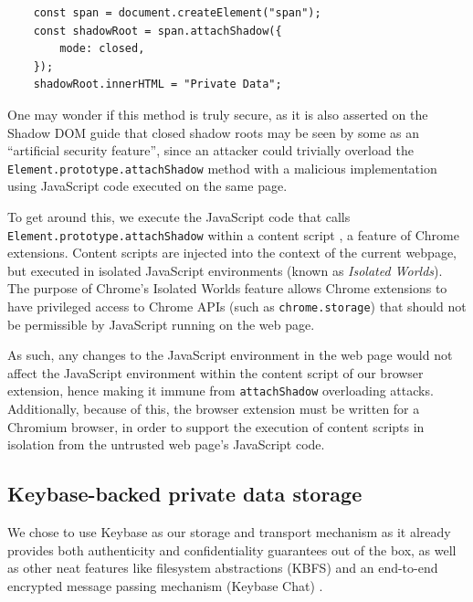\documentclass[letterpaper,twocolumn,10pt]{article}
\begin{document}
\begin{center}
    \begin{lstlisting}
    const span = document.createElement("span");
    const shadowRoot = span.attachShadow({
        mode: closed,
    });
    shadowRoot.innerHTML = "Private Data";
    \end{lstlisting}
    \label{fig:shadow_root}
\end{center}

One may wonder if this method is truly secure, as it is also asserted on the Shadow DOM guide \cite{Bidelman} that closed shadow roots may be seen by some as an ``artificial security feature'', since an attacker could trivially overload the \texttt{Element.prototype.attachShadow} method with a malicious implementation using JavaScript code executed on the same page.

To get around this, we execute the JavaScript code that calls \texttt{Element.prototype.attachShadow} within a content script \cite{ContentScript}, a feature of Chrome extensions. Content scripts are injected into the context of the current webpage, but executed in isolated JavaScript environments (known as \textit{Isolated Worlds}). The purpose of Chrome's Isolated Worlds feature allows Chrome extensions to have privileged access to Chrome APIs (such as \texttt{chrome.storage}) that should not be permissible by JavaScript running on the web page.

As such, any changes to the JavaScript environment in the web page would not affect the JavaScript environment within the content script of our browser extension, hence making it immune from \texttt{attachShadow} overloading attacks. Additionally, because of this, the browser extension must be written for a Chromium browser, in order to support the execution of content scripts in isolation from the untrusted web page's JavaScript code.

\subsection{Keybase-backed private data storage}

We chose to use Keybase \cite{Keybase} as our storage and transport mechanism as it already provides both authenticity and confidentiality guarantees out of the box, as well as other neat features like filesystem abstractions (KBFS) \cite{KBFS} and an end-to-end encrypted message passing mechanism (Keybase Chat) \cite{KeybaseChat}.
\end{document}
